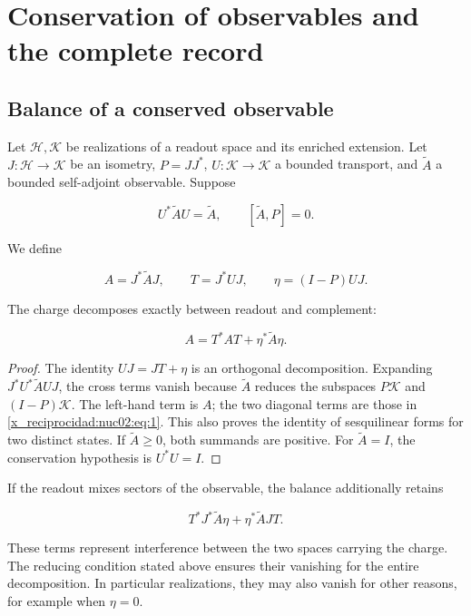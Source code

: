 \chapter{Conservation of observables and the complete record}
\label{x_reciprocidad:nuclear:2}
\section{Balance of a conserved observable}

Let \(\mathcal H,\mathcal K\) be realizations of a readout space and its enriched extension. Let \(J:\mathcal H\to\mathcal K\) be an isometry, \(P=JJ^*\), \(U:\mathcal K\to\mathcal K\) a bounded transport, and \(\widetilde A\) a bounded self-adjoint observable. Suppose

\[
U^*\widetilde A U=\widetilde A,\qquad [\widetilde A,P]=0.
\]

We define

\[
A=J^*\widetilde A J,\qquad T=J^*UJ,
\qquad \eta=(I-P)UJ.
\]

\begin{proposition}
\label{x_reciprocidad:nuc02:balance}
The charge decomposes exactly between readout and complement:

\begin{equation}
\boxed{A=T^*AT+\eta^*\widetilde A\eta.}\label{x_reciprocidad:nuc02:eq:1}
\end{equation}
\end{proposition}

\begin{proof}
The identity \(UJ=JT+\eta\) is an orthogonal decomposition. Expanding \(J^*U^*\widetilde A UJ\), the cross terms vanish because \(\widetilde A\) reduces the subspaces \(P\mathcal K\) and \((I-P)\mathcal K\). The left-hand term is \(A\); the two diagonal terms are those in \eqref{x_reciprocidad:nuc02:eq:1}. This also proves the identity of sesquilinear forms for two distinct states. If \(\widetilde A\geq0\), both summands are positive. For \(\widetilde A=I\), the conservation hypothesis is \(U^*U=I\).
\end{proof}

If the readout mixes sectors of the observable, the balance additionally retains

\[
T^*J^*\widetilde A\eta+\eta^*\widetilde A JT.
\]

These terms represent interference between the two spaces carrying the charge. The reducing condition stated above ensures their vanishing for the entire decomposition. In particular realizations, they may also vanish for other reasons, for example when \(\eta=0\).

